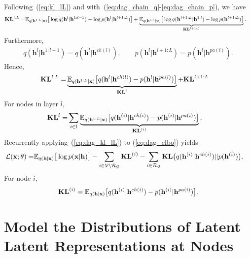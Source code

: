 \documentclass{article}
\begin{document}
Following~(\ref{eq:kl_lL}) and with~(\ref{eq:dag_chain_q}-\ref{eq:dag_chain_p}), we have 
 \begin{align} \notag
\textbf{\text{KL}}^{l:L} 
=&  \mathbb{E}_{q(\mathbf{h}^{1:L}|\mathbf{x})}\big[  \log q(\mathbf{h}^{l}|\mathbf{h}^{1:l-1})   - \log p(\mathbf{h}^{l}|\mathbf{h}^{l+1:L}) \big] + \underbrace{\mathbb{E}_{q(\mathbf{h}^{l:L}|\mathbf{x})}\big[  \log q(\mathbf{h}^{l+1:L}|\mathbf{h}^{1:l})- \log p(\mathbf{h}^{l+1:L})  \big]}_{\mathbf{KL}^{l+1:L}}.
\end{align}
Furthermore,
\begin{align*} 
q(\mathbf{h}^{l}|\mathbf{h}^{1:l-1})=q(\mathbf{h}^{l}|\mathbf{h}^{ch(l)}), \quad  \quad   p(\mathbf{h}^{l}|\mathbf{h}^{l+1:L}) = p(\mathbf{h}^{l}|\mathbf{h}^{pa(l)}).
\end{align*}
Hence,
 \begin{align} \label{eq:dag_kl_lL}
\textbf{\text{KL}}^{l:L} 
=&  \underbrace{\mathbb{E}_{q(\mathbf{h}^{1:L}|\mathbf{x})}\big[  q(\mathbf{h}^{l}|\mathbf{h}^{ch(l)})  - p(\mathbf{h}^{l}|\mathbf{h}^{pa(l)}) \big]}_{\textbf{\text{KL}}^{l}} +\textbf{\text{KL}}^{l+1:L} 
\end{align}
For nodes in layer $l$,
\begin{align} \notag
\textbf{\text{KL}}^{l} =& \sum_{i \in l} \underbrace{\mathbb{E}_{q(\mathbf{h}^{1:L}|\mathbf{x})}\big[  q(\mathbf{h}^{(i)}|\mathbf{h}^{ch(i)})  - p(\mathbf{h}^{(i)}|\mathbf{h}^{pa(i)}) \big]}_{\textbf{\text{KL}}^{(i)}} .
\end{align}
Recurrently applying~(\ref{eq:dag_kl_lL}) to (\ref{eq:dag_elbo}) yields
\begin{align}\notag %
\mathcal{L}(\mathbf{x}; \theta) =& \mathbb{E}_{q(\mathbf{h}|\mathbf{x})}\big[ \log p(\mathbf{x}|\mathbf{h})  \big] -  \sum_{i \in \mathcal{V}  \setminus  \mathcal{R}_{ \mathcal{G} }} \textbf{\text{KL}}^{(i)} -    \sum_{i \in  \mathcal{R}_{ \mathcal{G} }  }  \textbf{\text{KL}}\big(q(\mathbf{h}^{(i)} | \mathbf{h}^{ch(i)} )   || p(\mathbf{h}^{(i)})  \big) .
\end{align}
For node $i$, 
$$\textbf{\text{KL}}^{(i)} = \mathbb{E}_{q(\mathbf{h}|\mathbf{x})}\big[  q(\mathbf{h}^{(i)}|\mathbf{h}^{ch(i)})  - p(\mathbf{h}^{(i)}|\mathbf{h}^{pa(i)}) \big].$$

\section{Model the Distributions of Latent Latent Representations at Nodes}\label{sec:vfg_inference}
\end{document}
